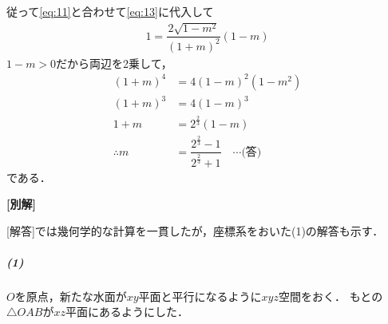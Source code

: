 \documentclass[../../main.tex]{subfiles}
\begin{document}
従って\cref{eq:11}と合わせて\cref{eq:13}に代入して
\begin{align}
  1 = \dfrac{2\sqrt{1-m^2}}{(1+m)^2}(1-m)
\end{align}
$1-m>0$だから両辺を2乗して，
\begin{align}
  (1+m)^4 &= 4(1-m)^2(1-m^2) \\
  (1+m)^3 &= 4(1-m)^3 \\
  1+m     &= 2^{\frac{2}{3}}(1-m) \\
  \therefore
  m &= \dfrac{2^{\frac{2}{3}}-1}{2^{\frac{2}{3}}+1} \quad\cdots\text{(答)}
\end{align}
である．

{\bf [別解]}

[解答]では幾何学的な計算を一貫したが，座標系をおいた(1)の解答も示す．

\subparagraph{(1)}

$O$を原点，新たな水面が$xy$平面と平行になるように$xyz$空間をおく．
もとの$\triangle OAB$が$xz$平面にあるようにした．
\end{document}
